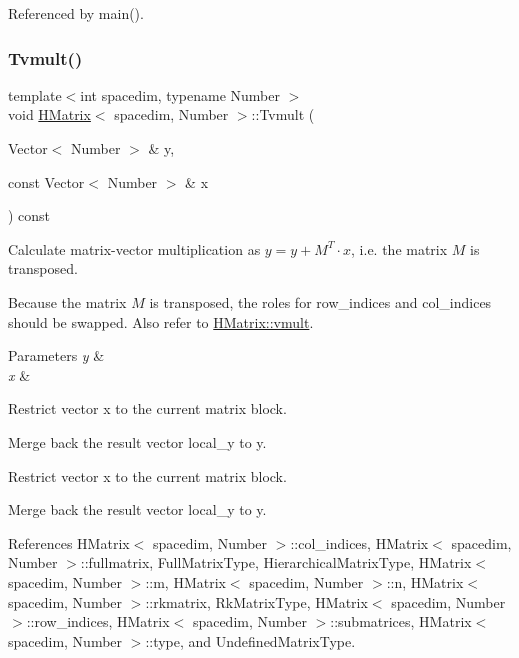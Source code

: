 Referenced by main().

\mbox{\label{classHMatrix_a72e5255eb5ce46136d0e2b195c82f016}} 
\subsubsection{\texorpdfstring{Tvmult()}{Tvmult()}}
{\footnotesize\ttfamily template$<$int spacedim, typename Number $>$ \\
void \hyperlink{classHMatrix}{H\+Matrix}$<$ spacedim, Number $>$\+::Tvmult (\begin{DoxyParamCaption}\item[{Vector$<$ Number $>$ \&}]{y,  }\item[{const Vector$<$ Number $>$ \&}]{x }\end{DoxyParamCaption}) const}

Calculate matrix-\/vector multiplication as $y = y + M^T \cdot x$, i.\+e. the matrix $M$ is transposed.

Because the matrix $M$ is transposed, the roles for {\ttfamily row\+\_\+indices} and {\ttfamily col\+\_\+indices} should be swapped. Also refer to \hyperlink{classHMatrix_aa11b5761aba86606effd14b4bdf31912}{H\+Matrix\+::vmult}. 
\begin{DoxyParams}{Parameters}
{\em y} & \\
\hline
{\em x} & \\
\hline
\end{DoxyParams}
Restrict vector x to the current matrix block.

Merge back the result vector {\ttfamily local\+\_\+y} to {\ttfamily y}.

Restrict vector x to the current matrix block.

Merge back the result vector {\ttfamily local\+\_\+y} to {\ttfamily y}.

References H\+Matrix$<$ spacedim, Number $>$\+::col\+\_\+indices, H\+Matrix$<$ spacedim, Number $>$\+::fullmatrix, Full\+Matrix\+Type, Hierarchical\+Matrix\+Type, H\+Matrix$<$ spacedim, Number $>$\+::m, H\+Matrix$<$ spacedim, Number $>$\+::n, H\+Matrix$<$ spacedim, Number $>$\+::rkmatrix, Rk\+Matrix\+Type, H\+Matrix$<$ spacedim, Number $>$\+::row\+\_\+indices, H\+Matrix$<$ spacedim, Number $>$\+::submatrices, H\+Matrix$<$ spacedim, Number $>$\+::type, and Undefined\+Matrix\+Type.

\mbox{\label{classHMatrix_a166893f3f371d4542cb57aaa33e533d1}} 
